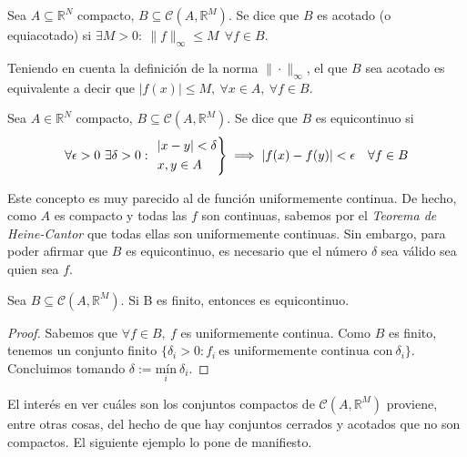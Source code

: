 \begin{ndef}
  Sea $A \subseteq \mathbb{R}^N$ compacto, $B \subseteq \mathcal{C}(A,\mathbb{R}^M)$. Se dice que $B$ es acotado (o equiacotado) si $\exists M > 0: \ \|f\|_{\infty} \le M \ \ \forall f \in B$.
\end{ndef}

\begin{nota}
  Teniendo en cuenta la definición de la norma $\|\cdot\|_\infty$, el que $B$ sea acotado es equivalente a decir que $|f(x)|\le M,\ \forall x \in A,\ \forall f \in B$.
\end{nota}

\begin{ndef}
  Sea $A \in \mathbb{R}^N$ compacto, $B \subseteq \mathcal{C}(A,\mathbb{R}^M)$. Se dice que $B$ es equicontinuo si $$\forall \epsilon > 0\ \exists \delta > 0:\ \begin{rcases} |x-y| < \delta\\ x,y \in A \end{rcases} \implies |f(x) - f(y)| < \epsilon \quad \forall f \in B$$
\end{ndef}

\begin{nota}
  Este concepto es muy parecido al de función uniformemente continua. De hecho, como $A$ es compacto y todas las $f$ son continuas, sabemos por el \textit{Teorema de Heine-Cantor} que todas ellas son uniformemente continuas. Sin embargo, para poder afirmar que $B$ es equicontinuo, es necesario que el número $\delta$ sea válido sea quien sea $f$.
\end{nota}

\begin{nprop} Sea $B \subseteq \mathcal{C}(A,\mathbb{R}^M)$. Si B es finito, entonces es equicontinuo.
\end{nprop}

  \begin{proof}
    Sabemos que $\forall f \in B,\ f$ es uniformemente continua. Como $B$ es finito, tenemos un conjunto finito $\{\delta_i > 0 : f_i \ \text{es uniformemente continua con} \ \delta_i\}$. Concluimos tomando $\delta := \underset{i}{\text{mín}} \ \delta_i$.
  \end{proof}

El interés en ver cuáles son los conjuntos compactos de $\mathcal{C}(A,\mathbb{R}^M)$ proviene, entre otras cosas, del hecho de que hay conjuntos cerrados y acotados que no son compactos. El siguiente ejemplo lo pone de manifiesto.

